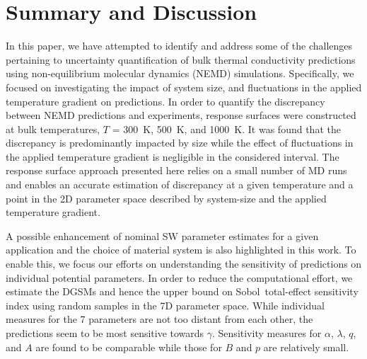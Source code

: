 \section{Summary and Discussion}
\label{sec:disc}

In this paper, we have attempted to identify and address some of the challenges
pertaining to uncertainty quantification of bulk thermal conductivity predictions 
using non-equilibrium molecular dynamics (NEMD) simulations. Specifically, we focused
on investigating the impact of system size, and fluctuations in the applied temperature
gradient on predictions. In order to quantify the discrepancy between NEMD
predictions and experiments, response surfaces were  
constructed at bulk temperatures, $T$ = 300~K, 500~K, and 1000~K.  
It was found that the discrepancy is predominantly impacted by size while the 
effect of fluctuations in the applied temperature gradient is negligible in the considered
interval. The response surface approach presented here relies on a small number of
MD runs and enables an accurate estimation of discrepancy at a given temperature
and a point in the 2D parameter space described by system-size and the applied
temperature gradient. 

A possible enhancement of nominal SW parameter estimates for a given application
and the choice of material system is also highlighted in this work. To enable this,
we focus our efforts on understanding the sensitivity of predictions on individual potential
parameters. In order to reduce the computational effort, we estimate the DGSMs
 and hence the upper bound
on Sobol\textquotesingle~total-effect sensitivity index using random samples in the 7D parameter space. 
While individual measures for the 7 parameters are not too distant from each other, the predictions
seem to be most sensitive towards $\gamma$. Sensitivity measures for $\alpha$,
$\lambda$, $q$, and $A$ are found to be comparable while those for $B$ and $p$
are relatively small. 

